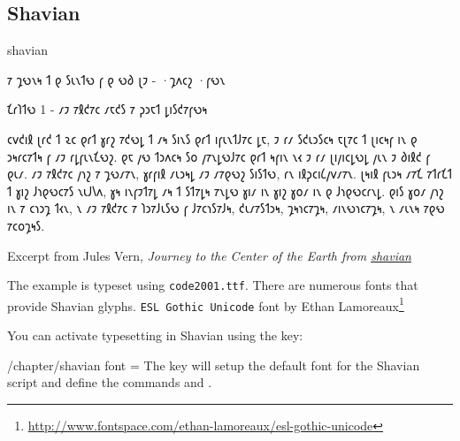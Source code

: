 \subsection{Shavian}

\def\shaviansetup#1{#1}
\newfontfamily{}

\cxset{shavian font/.code=\shaviansetup{#1}}




\begin{scriptexample}[]{shavian}
\shavian

𐑳 𐑡𐑻𐑯𐑰 𐑑 𐑞 𐑕𐑧𐑯𐑑𐑻 𐑝 𐑞 𐑻𐑔
𐑚𐑲 - ·𐑡𐑵𐑤𐑟 ·𐑝𐑻𐑯

𐑗𐑩𐑐𐑑𐑻 1 - 𐑥𐑲 𐑳𐑙𐑒𐑳𐑤 𐑥𐑱𐑒𐑕 𐑳 𐑜𐑮𐑱𐑑 𐑛𐑦𐑕𐑒𐑳𐑝𐑻𐑰

     𐑤𐑫𐑒𐑦𐑙 𐑚𐑩𐑒 𐑑 𐑷𐑤 𐑞𐑩𐑑 𐑣𐑩𐑟 𐑳𐑒𐑻𐑛 𐑑 𐑥𐑰 𐑕𐑦𐑯𐑕 𐑞𐑩𐑑 𐑦𐑝𐑧𐑯𐑑𐑓𐑳𐑤 𐑛𐑱, 𐑲 𐑩𐑥 𐑕𐑒𐑧𐑮𐑕𐑤𐑰 𐑱𐑚𐑳𐑤 𐑑 𐑚𐑦𐑤𐑰𐑝 𐑦𐑯 𐑞 𐑮𐑰𐑩𐑤𐑳𐑑𐑰 𐑝 𐑥𐑲 𐑩𐑛𐑝𐑧𐑯𐑗𐑻𐑟. 𐑞𐑱 𐑢𐑻 𐑑𐑮𐑵𐑤𐑰 𐑕𐑴 𐑢𐑳𐑯𐑛𐑻𐑓𐑳𐑤 𐑞𐑩𐑑 𐑰𐑝𐑦𐑯 𐑯𐑬 𐑲 𐑩𐑥 𐑚𐑦𐑢𐑦𐑤𐑛𐑻𐑛 𐑢𐑧𐑯 𐑲 𐑔𐑦𐑙𐑒 𐑝 𐑞𐑧𐑥.
     𐑥𐑲 𐑳𐑙𐑒𐑳𐑤 𐑢𐑪𐑟 𐑳 𐑡𐑻𐑥𐑳𐑯, 𐑣𐑩𐑝𐑦𐑙 𐑥𐑧𐑮𐑰𐑛 𐑥𐑲 𐑥𐑳𐑞𐑻𐑟 𐑕𐑦𐑕𐑑𐑻, 𐑩𐑯 𐑦𐑙𐑜𐑤𐑦𐑖𐑢𐑫𐑥𐑳𐑯. 𐑚𐑰𐑦𐑙 𐑝𐑧𐑮𐑰 𐑥𐑳𐑗 𐑳𐑑𐑩𐑗𐑑 𐑑 𐑣𐑦𐑟 𐑓𐑪𐑞𐑻𐑤𐑳𐑕 𐑯𐑧𐑓𐑘𐑵, 𐑣𐑰 𐑦𐑯𐑝𐑲𐑑𐑳𐑛 𐑥𐑰 𐑑 𐑕𐑑𐑳𐑛𐑰 𐑳𐑯𐑛𐑻 𐑣𐑦𐑥 𐑦𐑯 𐑣𐑦𐑟 𐑣𐑴𐑥 𐑦𐑯 𐑞 𐑓𐑪𐑞𐑻𐑤𐑩𐑯𐑛. 𐑞𐑦𐑕 𐑣𐑴𐑥 𐑢𐑪𐑟 𐑦𐑯 𐑳 𐑤𐑪𐑮𐑡 𐑑𐑬𐑯, 𐑯 𐑥𐑲 𐑳𐑙𐑒𐑳𐑤 𐑳 𐑐𐑮𐑳𐑓𐑧𐑕𐑻 𐑝 𐑓𐑳𐑤𐑪𐑕𐑳𐑓𐑰, 𐑒𐑧𐑥𐑳𐑕𐑑𐑮𐑰, 𐑡𐑰𐑪𐑤𐑳𐑡𐑰, 𐑥𐑦𐑯𐑻𐑪𐑤𐑳𐑡𐑰, 𐑯 𐑥𐑧𐑯𐑰 𐑳𐑞𐑻 𐑳𐑤𐑴𐑡𐑰𐑕.

\hfill Excerpt from Jules Vern,  \textit{Journey to the Center of the Earth from \href{http://shavian.weebly.com/}{shavian}}
\end{scriptexample}

The example is typeset using \texttt{code2001.ttf}. There are numerous fonts that provide Shavian glyphs. \texttt{ESL Gothic Unicode} font by Ethan Lamoreaux\footnote{\url{http://www.fontspace.com/ethan-lamoreaux/esl-gothic-unicode}}

You can activate typesetting in Shavian using the key:

\begin{key}{/chapter/shavian font = } The key will setup the
default font for the Shavian script and define the commands \cmd{\shavian} and \cmd{\textshavian}. 
\end{key}
